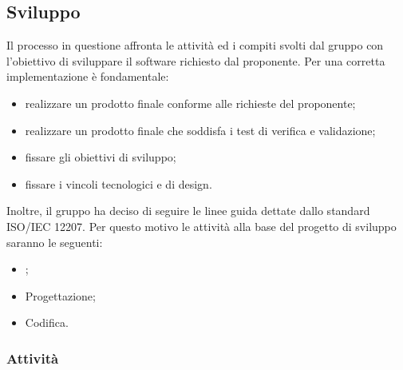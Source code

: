 \subsection{Sviluppo}
Il processo in questione affronta le attività ed i compiti svolti dal gruppo con l'obiettivo di sviluppare il software richiesto dal proponente. Per una corretta implementazione è fondamentale:
\begin{itemize}
		\item realizzare un prodotto finale conforme alle richieste del proponente;
		\item realizzare un prodotto finale che soddisfa i test di verifica e validazione;
		\item fissare gli obiettivi di sviluppo;
		\item fissare i vincoli tecnologici e di design.
\end{itemize}
Inoltre, il gruppo ha deciso di seguire le linee guida dettate dallo standard ISO/IEC 12207. Per questo motivo le attività alla base del progetto di sviluppo saranno le seguenti:
\begin{itemize}
	\item {};
	\item Progettazione;
	\item Codifica.
\end{itemize}
\subsubsection{Attività}
